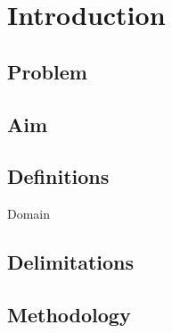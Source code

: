 \chapter{Introduction}

\section{Problem}
\section{Aim}
\section{Definitions}
\begin{definition}{Domain}
	
\end{definition}

\section{Delimitations}
\section{Methodology}
